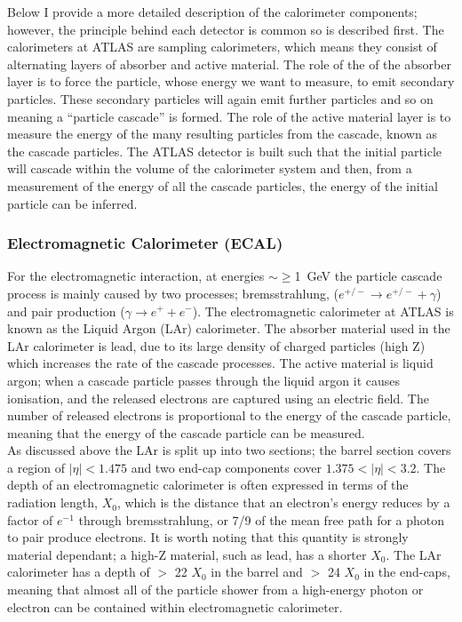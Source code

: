 Below I provide a more detailed description of the calorimeter components;
however, the principle behind each detector is common so is described first.
The calorimeters at ATLAS are sampling calorimeters, which means they consist of alternating layers of absorber and active material.
The role of the of the absorber layer is to force the particle, whose energy we want to measure, to emit secondary particles.
These secondary particles will again emit further particles and so on meaning a ``particle cascade'' is formed.
The role of the active material layer is to measure the energy of the many resulting particles from the cascade, known as the cascade particles.
The ATLAS detector is built such that the initial particle will cascade within the volume of the calorimeter system
and then, from a measurement of the energy of all the cascade particles,
the energy of the initial particle can be inferred. \\

\subsubsection{Electromagnetic Calorimeter (ECAL)}

For the electromagnetic interaction, at energies $\sim \geq$\SI{1}{\GeV} the particle cascade process is mainly caused by two processes;
bremsstrahlung, ($e^{+/-} \to e^{+/-} + \gamma$) and pair production ($\gamma \to e^{+} + e^{-}$).
The electromagnetic calorimeter at ATLAS is known as the Liquid Argon (LAr) calorimeter.
The absorber material used in the LAr calorimeter is lead, due to its large density of charged particles (high Z)
which increases the rate of the cascade processes.
The active material is liquid argon;
when a cascade particle passes through the liquid argon it causes ionisation,
and the released electrons are captured using an electric field.
The number of released electrons is proportional to the energy of the cascade particle,
meaning that the energy of the cascade particle can be measured. \\

As discussed above the LAr is split up into two sections;
the barrel section covers a region of $|\eta| < 1.475$ and two end-cap components cover $1.375 < |\eta| < 3.2$.
The depth of an electromagnetic calorimeter is often expressed in terms of the radiation length, $X_{0}$,
which is the distance that an electron's energy reduces by a factor of $e^{-1}$ through bremsstrahlung,
or 7/9 of the mean free path for a photon to pair produce electrons.
It is worth noting that this quantity is strongly material dependant;
a high-Z material, such as lead, has a shorter $X_0$.
The LAr calorimeter has a depth of $>$ 22 $X_{0}$ in the barrel and $>$ 24 $X_{0}$ in the end-caps,
meaning that almost all of the particle shower from a high-energy photon
or electron can be contained within electromagnetic calorimeter. \\

